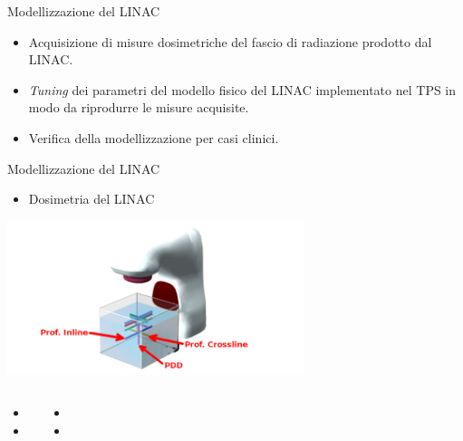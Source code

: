 \documentclass{beamer}
\begin{document}
\begin{frame}{Modellizzazione del LINAC}
\small
{}
\begin{itemize}
\item Acquisizione di misure dosimetriche del fascio di radiazione prodotto dal LINAC.
\item \textit{Tuning} dei parametri del modello fisico del LINAC implementato nel TPS in modo da riprodurre le misure acquisite.
\item Verifica della modellizzazione per casi clinici.
\end{itemize}
\end{frame}


\begin{frame}{Modellizzazione del LINAC}
\begin{itemize}
\scriptsize
{}
\item \alert{Dosimetria del LINAC}
\end{itemize}
\vspace{-.4cm}
\begin{center}
\includegraphics[height=4.5cm]{./img/Prof3D_ann.png}
\end{center}

\begin{columns}
\begin{itemize}
\footnotesize
\item {}
\item {}
\end{itemize}
\begin{itemize}
\footnotesize
\item {}
\item {}
\end{itemize}
\end{columns}
\end{frame}
\end{document}

